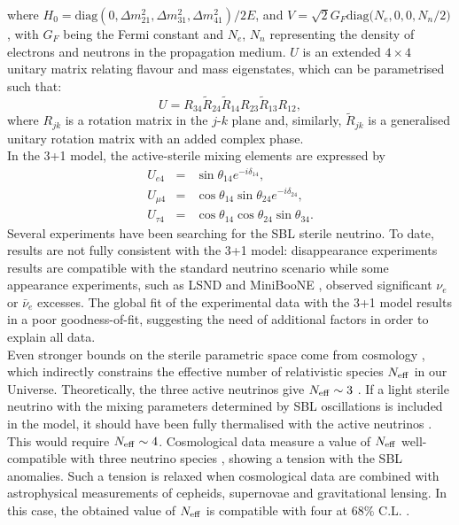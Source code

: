 \noindent where $H_0 = \mbox{diag}(0, \Delta{m^2_{21}}, \Delta{m^2_{31}}, \Delta{m^2_{41}}) / 2E$, and $V = \sqrt{2}G_F\mbox{diag(}N_e, 0, 0, N_n/2)$, with $G_F$ being the Fermi constant and $N_e$, $N_n$ representing the density of electrons and neutrons in the propagation medium. $U$ is an extended $4 \times 4$ unitary matrix relating flavour and mass eigenstates, which can be parametrised such that:
\begin{equation}
U = R_{34} \tilde{R}_{24} \tilde{R}_{14} R_{23} \tilde{R}_{13} R_{12},
\end{equation}
\noindent where $R_{jk}$ is a rotation matrix in the $j\mbox{-}k$ plane and, similarly, $\tilde{R}_{jk}$ is a generalised unitary rotation matrix with an added complex phase.
\\
 In the 3+1 model, the active-sterile mixing elements are expressed by 
\begin{eqnarray}
U_{e4} &=& \sin \theta_{14} e^{-i \delta_{14}}, \\
U_{\mu4} &= & \cos \theta_{14} \sin \theta_{24} e^{-i \delta_{24}}, \\
U_{\tau4} &=& \cos \theta_{14} \cos \theta_{24} \sin \theta_{34}.
\end{eqnarray}
Several experiments have been searching for the SBL sterile neutrino. To date, results are not fully consistent with the 3+1 model: disappearance experiments results are compatible with the standard neutrino scenario while some appearance experiments, such as LSND \cite{LSND} and MiniBooNE \cite{Miniboone}, observed significant $\nu_e$ or $\bar{\nu}_e$ excesses. The global fit of the experimental data with the 3+1 model results in a poor goodness-of-fit, suggesting the need of additional factors in order to explain all data.
\\
Even stronger bounds on the sterile parametric space come from cosmology \cite{strongboundCosmology}, which indirectly constrains the effective number of relativistic species $N_{\rm eff}$ in our Universe. Theoretically, the three active neutrinos give $N_{\rm eff} \sim 3$ \cite{Dolgov}. If a light sterile neutrino with the mixing parameters determined by SBL oscillations is included in the model, it should have been fully thermalised with the active neutrinos \cite{gariazzo2016light}.
This would require $N_{\rm eff} \sim 4$. Cosmological data measure a value of $N_{\rm eff}$ well-compatible with three neutrino species \cite{review_nu_cosmo}, showing a tension with the SBL anomalies. Such a tension is relaxed when cosmological data are combined with astrophysical measurements of cepheids, supernovae and gravitational lensing. In this case, the obtained value of $N_{\rm eff}$ is compatible with four at 68$\%$ C.L. \cite{review_nu_cosmo, gariazzo2016light}.
